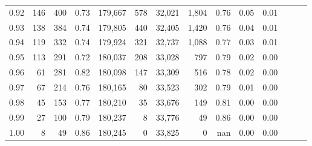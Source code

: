 \begin{tabular}{rrrrrrrrrrrrrr}
0.92 &    146 &  400 &  0.73 &  179,667 &      578 &  32,021 &   1,804 &  0.76 &  0.05 &      0.01 \\
0.93 &    138 &  384 &  0.74 &  179,805 &      440 &  32,405 &   1,420 &  0.76 &  0.04 &      0.01 \\
0.94 &    119 &  332 &  0.74 &  179,924 &      321 &  32,737 &   1,088 &  0.77 &  0.03 &      0.01 \\
0.95 &    113 &  291 &  0.72 &  180,037 &      208 &  33,028 &     797 &  0.79 &  0.02 &      0.00 \\
0.96 &     61 &  281 &  0.82 &  180,098 &      147 &  33,309 &     516 &  0.78 &  0.02 &      0.00 \\
0.97 &     67 &  214 &  0.76 &  180,165 &       80 &  33,523 &     302 &  0.79 &  0.01 &      0.00 \\
0.98 &     45 &  153 &  0.77 &  180,210 &       35 &  33,676 &     149 &  0.81 &  0.00 &      0.00 \\
0.99 &     27 &  100 &  0.79 &  180,237 &        8 &  33,776 &      49 &  0.86 &  0.00 &      0.00 \\
1.00 &      8 &   49 &  0.86 &  180,245 &        0 &  33,825 &       0 &   nan &  0.00 &      0.00 \\
\bottomrule
\end{tabular}
